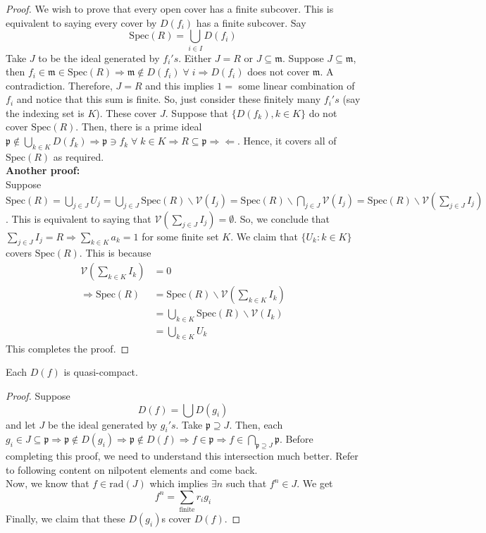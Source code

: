 \documentclass[oneside, 12pt]{scrbook}
\newcommand{\V}{\mathcal{V}}
\newcommand{\spec}{\mathrm{Spec}}
\newcommand{\pr}{\mathfrak{p}}
\newcommand{\m}{\mathfrak{m}}
\theoremstyle{theorem}
\begin{document}
\begin{proof}
We wish to prove that every open cover has a finite subcover. This is equivalent to saying every cover by $D(f_{i})$ has a finite subcover. Say $$\spec(R) = \bigcup_{i \in I} D(f_{i})$$ Take $J$ to be the ideal generated by $f_{i}'s$. Either $J = R$ or $J \subseteq \mathfrak{m}$. Suppose $J \subseteq \m$, then $f_{i} \in \m \in \spec(R) \Rightarrow \m \not \in D(f_{i}) \; \forall \; i \Rightarrow D(f_{i})$ does not cover $\m$. A contradiction. Therefore, $J=R$ and this implies $1 =$ some linear combination of $f_{i}$ and notice that this sum is finite. So, just consider these finitely many $f_{i}'s$ (say the indexing set is $K$). These cover $J$. Suppose that $\{ D(f_{k}), k \in K\}$ do not cover $\spec(R)$. Then, there is a prime ideal $\pr \not \in \bigcup_{k\in K}D(f_{k}) \Rightarrow \pr \ni f_{k} \; \forall\; k \in K \Rightarrow R \subseteq \pr \Rightarrow \Leftarrow$. Hence, it covers all of $\spec(R)$ as required. \\

\textbf{Another proof:}\\
Suppose $\spec(R) = \bigcup_{j \in J} U_{j} = \bigcup_{j \in J} \spec(R) \backslash \V(I_{j}) = \spec(R) \backslash \bigcap_{j \in J} \V(I_{j}) =\spec(R) \backslash \V(\sum_{j \in J} I_{j})$. This is equivalent to saying that $\V(\sum_{j \in J} I_{j}) = \emptyset$. So, we conclude that $\sum_{j \in J}I_{j} = R \Rightarrow \sum_{k \in K}a_{k} = 1$ for some finite set $K$. We claim that $\{U_{k}: k \in K\}$ covers $\spec(R)$. This is because 
\begin{align*}
\V(\sum_{k\in K} I_{k}) &= 0 \\
\Rightarrow \spec(R) &= \spec(R) \backslash \V(\sum_{k\in K} I_{k})  \\
&= \bigcup_{k \in K} \spec(R) \backslash \V(I_{k}) \\
&= \bigcup_{k \in K} U_{k}
\end{align*}
This completes the proof. 
\end{proof}

\begin{proposition}
Each $D(f)$ is quasi-compact.
\end{proposition}

\begin{proof}
Suppose $$D(f) = \bigcup D(g_{i})$$ and let $J$ be the ideal generated by $g_{i}'s$. Take $\mathfrak{p} \supseteq J$. Then, each $g_{i} \in J \subseteq \mathfrak{p} \Rightarrow \mathfrak{p} \not \in D(g_{i}) \Rightarrow \mathfrak{p} \not \in D(f) \Rightarrow f \in \mathfrak{p} \Rightarrow f \in \bigcap_{\mathfrak{p} \supseteq J} \mathfrak{p}$. \textcolor{BrickRed}{Before completing this proof, we need to understand this intersection much better. Refer to following content on nilpotent elements and come back.}\\
Now, we know that $f \in \mathrm{rad}(J)$ which implies $\exists n$ such that $f^n \in J$. We get $$f^n = \sum_{\text{finite}} r_{i}g_{i}$$ Finally, we claim that these $D(g_{i})$s cover $D(f)$. 
\end{proof}
\end{document}
